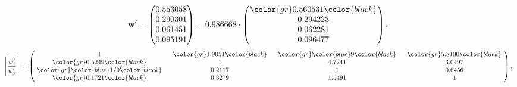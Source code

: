 \begin{example}
\begin{equation*}
\mathbf{w}^{\prime} =
\begin{pmatrix}
0.553058\\
0.290301\\
0.061451\\
0.095191
\end{pmatrix} =
0.986668\cdot
\begin{pmatrix}
\color{gr} 0.560531\color{black} \\
0.294223\\
0.062281\\
0.096477
\end{pmatrix},
\end{equation*}
\begin{equation*}
\left[ \frac{{w}^{\prime}_i}{{w}^{\prime}_j} \right] =
\begin{pmatrix}
$\,\,$ 1 $\,\,$ & $\,\,$\color{gr} 1.9051\color{black} $\,\,$ & $\,\,$\color{gr} \color{blue} 9\color{black} $\,\,$ & $\,\,$\color{gr} 5.8100\color{black} $\,\,$ \\
$\,\,$\color{gr} 0.5249\color{black} $\,\,$ & $\,\,$ 1 $\,\,$ & $\,\,$4.7241$\,\,$ & $\,\,$3.0497  $\,\,$ \\
$\,\,$\color{gr} \color{blue}  1/9\color{black} $\,\,$ & $\,\,$0.2117$\,\,$ & $\,\,$ 1 $\,\,$ & $\,\,$0.6456 $\,\,$ \\
$\,\,$\color{gr} 0.1721\color{black} $\,\,$ & $\,\,$0.3279$\,\,$ & $\,\,$1.5491$\,\,$ & $\,\,$ 1  $\,\,$ \\
\end{pmatrix},
\end{equation*}
\end{example}
\newpage
